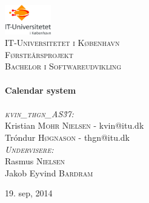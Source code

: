 \begin{titlepage}
\begin{center}

\includegraphics[width=0.15\textwidth]{./logo}~\\[1cm]

\textsc{\LARGE IT-Universitetet i København}\\[1.5cm]

\textsc{\Large Førsteårsprojekt}\\[0.5cm]
\textsc{Bachelor i Softwareudvikling}\\[0.5cm]

\HRule \\[0.4cm]
{ \huge \bfseries Calendar system \\[0.4cm] }
\HRule \\[1.5cm]

\textsc{\LARGE \emph{kvin\_thgn\_AS\.37:}}\\
\vspace{2 mm}
\large
Kristian \textsc{Mohr Nielsen} - kvin@itu.dk\\
Tróndur \textsc{Høgnason} - thgn@itu.dk\\
\vspace{10 mm}
\large
\textsc{\large \emph{Undervisere:}}\\
\vspace{1 mm}
Rasmus \textsc{Nielsen} \\
Jakob Eyvind \textsc{Bardram}

\vfill

{\large 19. sep, 2014}
\end{center}
\end{titlepage}